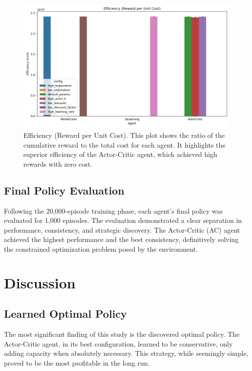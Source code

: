 \documentclass{article}
\begin{document}
\begin{figure}[h!]
    \centering
    \includegraphics[width=\textwidth]{figures/efficiency.png}
    \caption{Efficiency (Reward per Unit Cost). This plot shows the ratio of the cumulative reward to the total cost for each agent. It highlights the superior efficiency of the Actor-Critic agent, which achieved high rewards with zero cost.}
    \label{fig:efficiency}
\end{figure}

\subsection{Final Policy Evaluation}

Following the 20,000-episode training phase, each agent's final policy was evaluated for 1,000 episodes. The evaluation demonstrated a clear separation in performance, consistency, and strategic discovery. The Actor-Critic (AC) agent achieved the highest performance and the best consistency, definitively solving the constrained optimization problem posed by the environment.

\section{Discussion}

\subsection{Learned Optimal Policy}

The most significant finding of this study is the discovered optimal policy. The Actor-Critic agent, in its best configuration, learned to be conservative, only adding capacity when absolutely necessary. This strategy, while seemingly simple, proved to be the most profitable in the long run.
\end{document}
